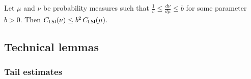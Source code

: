 \begin{lemma}\label{lem:HS-perturb}
Let $\mu$ and $\nu$ be probability measures such that $\frac{1}{b}\leq \frac{d\nu}{d\mu}\leq b$ for some parameter $b>0$. Then $C_{\mathsf{LSI}}(\nu)\leq b^2\,C_{\mathsf{LSI}}(\mu)$.
\end{lemma}





\subsection{Technical lemmas}


\subsubsection{Tail estimates}

